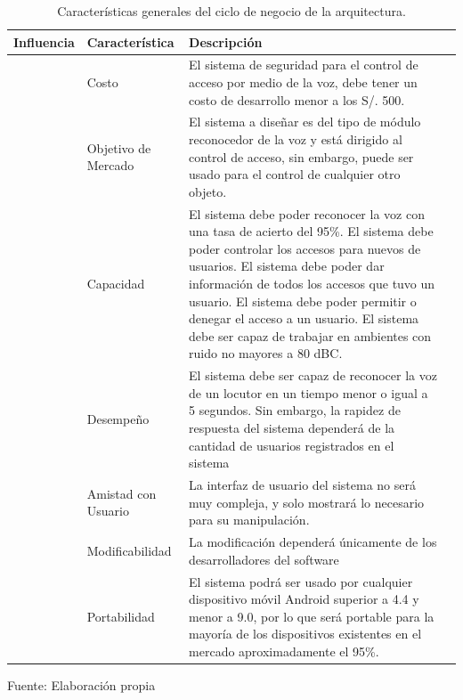 \begin{center}
\begin{table}[H]
\centering
\caption{\small{Características generales del ciclo de negocio de la arquitectura.}}
\label{table:tabla3.1}
\vskip 0.2cm
\begin{tabular}{|p{3cm}|p{4cm}|p{6cm}|p{3cm}|}
\hline
{\small Influencia} & {\small Característica} & {\small Descripción}  \\ 
\hline 
{\small \multirow{3}{4em}{Negocios}} & {\small Costo} & {\small El sistema de seguridad para el control de acceso por medio de la voz, debe tener un costo de desarrollo menor a los S/. 500.}  \\ 
\cline{2-3}
 & {\small Objetivo de Mercado} & {\small El sistema a diseñar es del tipo de módulo reconocedor de la voz y está dirigido al control de acceso, sin embargo, puede ser usado para el control de cualquier otro objeto.}  \\ 
\cline{2-3}
 & {\small Capacidad} & {\small El sistema debe poder reconocer la voz con una tasa de acierto del 95\%. El sistema debe poder controlar los accesos para nuevos de usuarios. El sistema debe poder dar información de todos los accesos que tuvo un usuario. El sistema debe poder permitir o denegar el acceso a un usuario. El sistema debe ser capaz de trabajar en ambientes con ruido no mayores a 80 dBC.
} \\
\hline 
{\small \multirow{4}{4em}{Técnicos}} & {\small Desempeño} & {\small El sistema debe ser capaz de reconocer la voz de un locutor en un tiempo menor o igual a 5 segundos. Sin embargo, la rapidez de respuesta del sistema dependerá de la cantidad de usuarios registrados en el sistema}  \\ 
\cline{2-3}
 & {\small Amistad con Usuario} & {\small La interfaz de usuario del sistema no será muy compleja, y solo mostrará lo necesario para su manipulación.}  \\ 
\cline{2-3}
 & {\small Modificabilidad} & {\small La modificación dependerá únicamente de los desarrolladores del software}  \\ 
\cline{2-3}
 & {\small Portabilidad} & {\small El sistema podrá ser usado por cualquier dispositivo móvil Android superior a 4.4
y menor a 9.0, por lo que será portable para la mayoría de los dispositivos existentes en el mercado aproximadamente el 95\%.}  \\ 
\hline 
\end{tabular} 
\begin{center}
\vskip 0.2cm
{\small{Fuente: Elaboración propia}}
\end{center}
\end{table}
\end{center}

